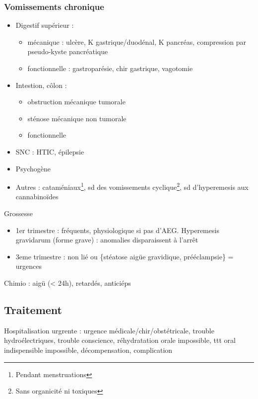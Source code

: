 \documentclass[11pt]{article}
\begin{document}
\subsubsection{Vomissements chronique}
\label{sec:orgc1dae74}
\begin{itemize}
\item Digestif supérieur : 
\begin{itemize}
\item mécanique : ulcère, K gastrique/duodénal, K pancréas, compression par
pseudo-kyste pancréatique
\item fonctionnelle : gastroparésie, chir gastrique, vagotomie
\end{itemize}
\item Intestion, côlon :
\begin{itemize}
\item obstruction mécanique tumorale
\item sténose mécanique non tumorale
\item fonctionnelle
\end{itemize}
\item SNC : HTIC, épilepsie
\item Psychogène
\item Autres : cataméniaux\footnote{Pendant menstruations}, sd des vomissements cyclique\footnote{Sans organicité ni toxiques}, sd d'hyperemesis aux cannabinoïdes
\end{itemize}
Grossesse
\begin{itemize}
\item 1er trimestre : fréquents, physiologique si pas d'AEG. Hyperemesis gravidarum
(forme grave) : anomalies disparaissent à l'arrêt
\item 3eme trimestre : non lié ou \{stéatose aigüe gravidique, prééclampsie\} =
urgences \faBomb
\end{itemize}
Chimio : aigü (< 24h), retardés, anticiéps

\subsection{Traitement}
\label{sec:org1611ee8}
Hospitalisation urgrente : urgence médicale/chir/obstétricale, trouble
hydroélectriques, trouble conscience, réhydratation orale impossible, ttt oral
indispensible impossible, décompensation, complication
\end{document}
